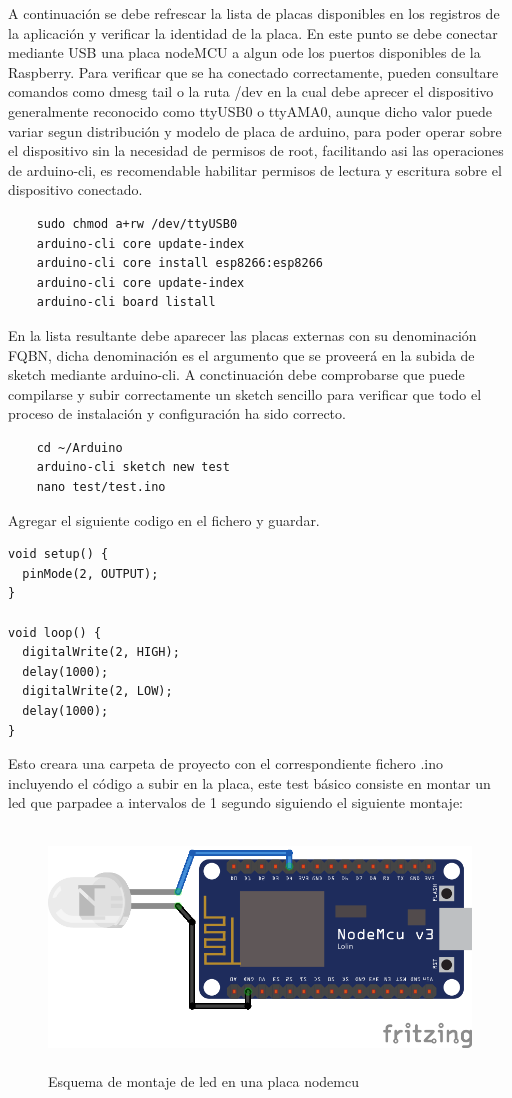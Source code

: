 A continuación se debe refrescar la lista de placas disponibles en los registros de la aplicación y verificar la identidad de la placa. En este punto se debe conectar mediante USB una placa nodeMCU a algun ode los puertos disponibles de la Raspberry. Para verificar que se ha conectado correctamente, pueden consultare comandos como dmesg tail o la ruta /dev en la cual debe aprecer el dispositivo generalmente reconocido como ttyUSB0 o ttyAMA0, aunque dicho valor puede variar segun distribución y modelo de placa de arduino, para poder operar sobre el dispositivo sin la necesidad de permisos de root, facilitando asi las operaciones de arduino-cli, es recomendable habilitar permisos de lectura y escritura sobre el dispositivo conectado.

\begin{verbatim}
    sudo chmod a+rw /dev/ttyUSB0
    arduino-cli core update-index
    arduino-cli core install esp8266:esp8266
    arduino-cli core update-index
    arduino-cli board listall
\end{verbatim}

En la lista resultante debe aparecer las placas externas con su denominación FQBN, dicha denominación es el argumento que se proveerá en la subida de sketch mediante arduino-cli. A conctinuación debe comprobarse que puede compilarse y subir correctamente un sketch sencillo para verificar que todo el proceso de instalación y configuración ha sido correcto.

\begin{verbatim}
    cd ~/Arduino
    arduino-cli sketch new test
    nano test/test.ino
\end{verbatim}

Agregar el siguiente codigo en el fichero y guardar.
\begin{verbatim}
void setup() {
  pinMode(2, OUTPUT);
}

void loop() {
  digitalWrite(2, HIGH);
  delay(1000);
  digitalWrite(2, LOW);
  delay(1000);
}
\end{verbatim}

Esto creara una carpeta de proyecto con el correspondiente fichero .ino incluyendo el código a subir en la placa, este test básico consiste en montar un led que parpadee a intervalos de 1 segundo siguiendo el siguiente montaje:

\begin{figure}[hbt!]
\centering
\includegraphics[height=2.5in]{figures/nodemcu-test1.png}
\caption[Montaje placa nodeMCU con led]{Esquema de montaje de led en una placa nodemcu}
    \label{figure1}
\end{figure}

